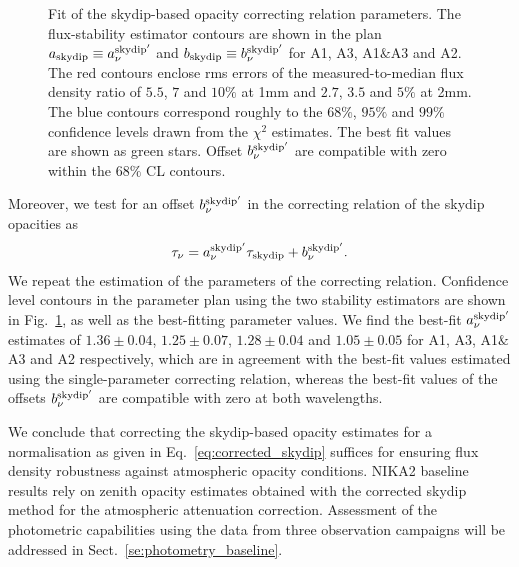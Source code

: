 \begin{figure}[ht!]
\begin{center}
    \caption[NIKA2 skydip-based opacity correcting
    relation]{Fit of the skydip-based opacity correcting relation
    parameters.
    The flux-stability estimator contours are shown in the plan
    $a_{\rm{skydip}} \equiv a_\nu^{\rm{skydip}'}$ and
    $b_{\rm{skydip}} \equiv b_\nu^{\rm{skydip}'}$
    for A1, A3, A1$\&$A3 and A2.
    The red contours enclose rms
    errors of the measured-to-median flux density ratio of $5.5$, $7$
    and $10\%$ at 1mm and $2.7$, $3.5$ and $5\%$ at 2mm. The blue
    contours correspond roughly to the $68\%$, $95\%$ and $99\%$
    confidence levels drawn from the $\chi^2$ estimates.
    The best fit values are shown as green stars. Offset
    $b_\nu^{\rm{skydip}'}$ are compatible with zero within the $68\%$
    CL contours.} 
\label{fig:skydip_fit}
\end{center}
\end{figure}

Moreover, we test for an offset $b_\nu^{\rm{skydip}'}$ in the
correcting relation of the skydip opacities as 
\begin{equation}  
  \tau_\nu =  a_\nu^{\rm{skydip}'}\tau_{\rm{skydip}} + b_\nu^{\rm{skydip}'}.      
\end{equation}
We repeat the estimation of the parameters of the correcting
relation. Confidence level contours in the parameter plan using the
two stability estimators are shown in Fig.~\ref{fig:skydip_fit}, as
well as the
best-fitting parameter values.
We find the best-fit $a_\nu^{\rm{skydip}'}$ estimates of
$1.36 \pm 0.04$,
$1.25 \pm 0.07$,
$1.28 \pm 0.04$ and
$1.05 \pm 0.05$ for A1, A3, A1$\&$A3 and A2 respectively, which are in
agreement with the best-fit values estimated using the single-parameter
correcting relation, whereas the best-fit values of the offsets
$b_\nu^{\rm{skydip}'}$ are compatible with zero at both wavelengths.

We conclude that correcting the skydip-based opacity estimates for a
normalisation as given in Eq.~\ref{eq:corrected_skydip} suffices for
ensuring flux density robustness against atmospheric opacity conditions.
NIKA2 baseline results rely on zenith opacity estimates obtained with
the corrected skydip method for the atmospheric attenuation
correction. Assessment of the photometric capabilities using the data
from three observation campaigns will be addressed in
Sect.~\ref{se:photometry_baseline}. 



